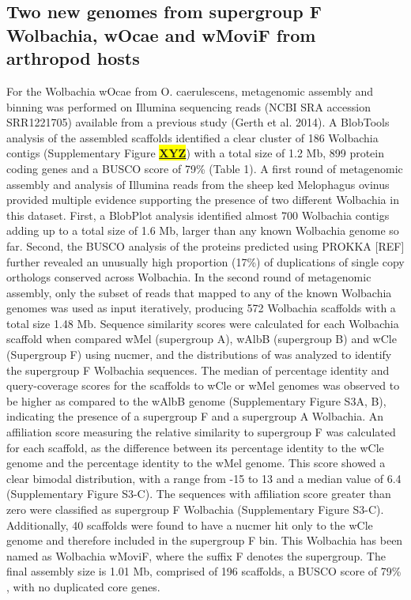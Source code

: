 \documentclass[10pt, a4paper, twocolumn]{article} %
\begin{document}
\subsection{Two new genomes from supergroup F Wolbachia, wOcae and wMoviF from arthropod hosts}
For the Wolbachia wOcae from O. caerulescens, metagenomic assembly and binning was performed on Illumina sequencing reads (NCBI SRA accession SRR1221705) available from a previous study (Gerth et al. 2014). A BlobTools analysis of the assembled scaffolds identified a clear cluster of 186 Wolbachia contigs (Supplementary Figure \underline{\textbf{\colorbox{Yellow}{XYZ}}}) with a total size of 1.2 Mb, 899 protein coding genes and a BUSCO score of 79\% (Table 1). 
A first round of metagenomic assembly and analysis of Illumina reads from the sheep ked Melophagus ovinus provided multiple evidence supporting the presence of two different Wolbachia in this dataset.  First, a BlobPlot analysis identified almost 700 Wolbachia contigs adding up to a total size of 1.6 Mb, larger than any known Wolbachia genome so far. Second, the BUSCO analysis of the proteins predicted using PROKKA [REF] further revealed an unusually high proportion (17\%) of duplications of single copy orthologs conserved across Wolbachia. In the second round of metagenomic assembly, only the subset of reads that mapped to any of the known Wolbachia genomes was used as input iteratively, producing 572 Wolbachia scaffolds with a total size 1.48 Mb. Sequence similarity scores were calculated for each Wolbachia scaffold when compared wMel (supergroup A), wAlbB (supergroup B) and wCle (Supergroup F) using nucmer, and the distributions of was analyzed to identify the supergroup F Wolbachia sequences. The median of percentage identity and query-coverage scores for the scaffolds to wCle or wMel genomes was observed to be higher as compared to the wAlbB genome (Supplementary Figure S3A, B), indicating the presence of a supergroup F and a supergroup A Wolbachia. An affiliation score measuring the relative similarity to supergroup F was calculated for each scaffold, as the difference between its percentage identity to the wCle genome and the percentage identity to the wMel genome. This score showed a clear bimodal distribution, with a range from -15 to 13 and a median value of 6.4 (Supplementary Figure S3-C). The sequences with affiliation score greater than zero were classified as supergroup F Wolbachia (Supplementary Figure S3-C). Additionally, 40 scaffolds were found to have a nucmer hit only to the wCle genome and therefore included in the supergroup F bin. This Wolbachia has been named as Wolbachia wMoviF, where the suffix F denotes the supergroup. The final assembly size is 1.01 Mb, comprised of 196 scaffolds, a BUSCO score of 79\% , with no duplicated core genes. 
\end{document}
